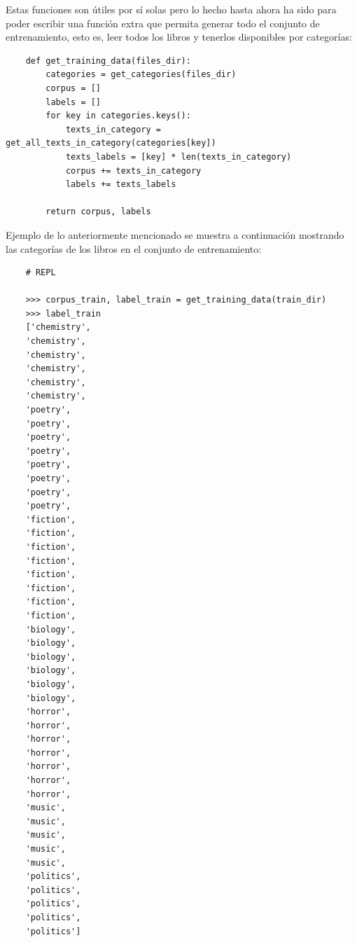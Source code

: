 Estas funciones son útiles por sí solas pero lo hecho hasta ahora ha sido para poder escribir una función extra que permita generar todo el conjunto de entrenamiento, esto es, leer todos los libros y tenerlos disponibles por categorías:
\begin{verbatim}
    def get_training_data(files_dir):
        categories = get_categories(files_dir)
        corpus = []
        labels = []
        for key in categories.keys():
            texts_in_category = get_all_texts_in_category(categories[key])
            texts_labels = [key] * len(texts_in_category)
            corpus += texts_in_category
            labels += texts_labels
            
        return corpus, labels
\end{verbatim}

Ejemplo de lo anteriormente mencionado se muestra a continuación mostrando las categorías de los libros en el conjunto de entrenamiento:
\begin{verbatim}
    # REPL

    >>> corpus_train, label_train = get_training_data(train_dir)
    >>> label_train
    ['chemistry',
    'chemistry',
    'chemistry',
    'chemistry',
    'chemistry',
    'chemistry',
    'poetry',
    'poetry',
    'poetry',
    'poetry',
    'poetry',
    'poetry',
    'poetry',
    'poetry',
    'fiction',
    'fiction',
    'fiction',
    'fiction',
    'fiction',
    'fiction',
    'fiction',
    'fiction',
    'biology',
    'biology',
    'biology',
    'biology',
    'biology',
    'biology',
    'horror',
    'horror',
    'horror',
    'horror',
    'horror',
    'horror',
    'horror',
    'music',
    'music',
    'music',
    'music',
    'music',
    'politics',
    'politics',
    'politics',
    'politics',
    'politics']
\end{verbatim}

